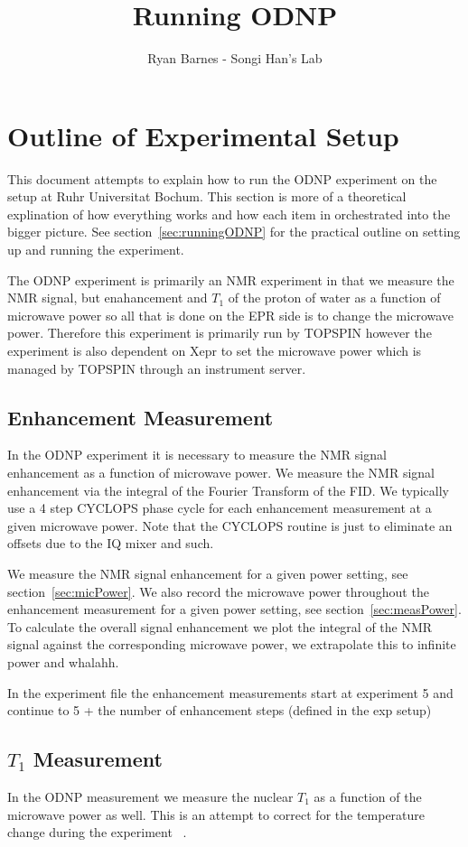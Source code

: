 \documentclass{article}
\title{Running ODNP}
\author{Ryan Barnes - Songi Han's Lab}
\begin{document}
\maketitle
\tableofcontents
\newpage

\section{Outline of Experimental Setup}
This document attempts to explain how to run the ODNP experiment on the setup at Ruhr Universitat Bochum. This section is more of a theoretical explination of how everything works and how each item in orchestrated into the bigger picture. See section~\ref{sec:runningODNP} for the practical outline on setting up and running the experiment.

The ODNP experiment is primarily an NMR experiment in that we measure the NMR signal, but enahancement and $T_1$ of the proton of water as a function of microwave power so all that is done on the EPR side is to change the microwave power. Therefore this experiment is primarily run by TOPSPIN however the experiment is also dependent on Xepr to set the microwave power which is managed by TOPSPIN through an instrument server.

\subsection{Enhancement Measurement}
In the ODNP experiment it is necessary to measure the NMR signal enhancement as a function of microwave power. We measure the NMR signal enhancement via the integral of the Fourier Transform of the FID. We typically use a 4 step CYCLOPS phase cycle for each enhancement measurement at a given microwave power. Note that the CYCLOPS routine is just to eliminate an offsets due to the IQ mixer and such.

We measure the NMR signal enhancement for a given power setting, see section~\ref{sec:micPower}. We also record the microwave power throughout the enhancement measurement for a given power setting, see section~\ref{sec:measPower}. To calculate the overall signal enhancement we plot the integral of the NMR signal against the corresponding microwave power, we extrapolate this to infinite power and whalahh.

In the experiment file the enhancement measurements start at experiment 5 and continue to 5 + the number of enhancement steps (defined in the exp setup)

\subsection{$T_1$ Measurement}
In the ODNP measurement we measure the nuclear $T_1$ as a function of the microwave power as well. This is an attempt to correct for the temperature change during the experiment ~\cite{Franck2013}.
\end{document}
